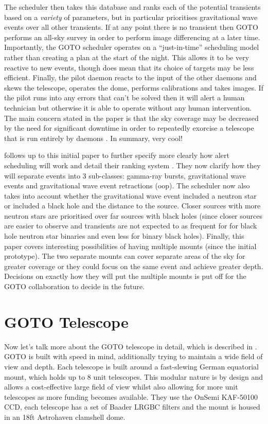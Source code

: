 \documentclass[twocolumn]{aastex631}
\begin{document}
The scheduler then takes this database and ranks each of the potential transients based on a \textit{variety} of parameters, but in particular prioritises gravitational wave events over all other transients. If at any point there is no transient then GOTO performs an all-sky survey in order to perform image differencing at a later time. Importantly, the GOTO scheduler operates on a ``just-in-time'' scheduling model rather than creating a plan at the start of the night. This allows it to be very reactive to new events, though does mean that its choice of targets may be less efficient. Finally, the pilot daemon reacts to the input of the other daemons and skews the telescope, operates the dome, performs calibrations and takes images. If the pilot runs into any errors that can't be solved then it will alert a human technician but otherwise it is able to operate without any human intervention. The main concern stated in the paper is that the sky coverage may be decreased by the need for significant downtime in order to repeatedly exorcise a telescope that is run entirely by daemons \citep{2004exorcismis}. In summary, very cool!

\citet{Dyer+2020} follows up to this initial paper to further specify more clearly how alert scheduling will work and detail their ranking system \citep[e.g.\ see Eq.~1][]{Dyer+2020}. They now clarify how they will separate events into 3 sub-classes: gamma-ray bursts, gravitational wave events and gravitational wave event retractions (oop). The scheduler now also takes into account whether the gravitational wave event included a neutron star or included a black hole and the distance to the source. Closer sources with more neutron stars are prioritised over far sources with black holes (since closer sources are easier to observe and transients are not expected to as frequent for for black hole neutron star binaries and even less for binary black holes). Finally, this paper covers interesting possibilities of having multiple mounts (since the initial prototype). The two separate mounts can cover separate areas of the sky for greater coverage or they could focus on the same event and achieve greater depth. Decisions on exactly how they will put the multiple mounts is put off for the GOTO collaboration to decide in the future.

\section{GOTO Telescope}
Now let's talk more about the GOTO telescope in detail, which is described in \citet{GOTO+2020}. GOTO is built with speed in mind, additionally trying to maintain a wide field of view and depth. Each telescope is built around a fast-slewing German equatorial mount, which holds up to 8 unit telescopes. This modular nature is by design and allows a cost-effective large field of view whilst also allowing for more unit telescopes as more funding becomes available. They use the OnSemi KAF-50100 CCD, each telescope has a set of Baader LRGBC filters and the mount is housed in an 18ft Astrohaven clamshell dome.
\end{document}
